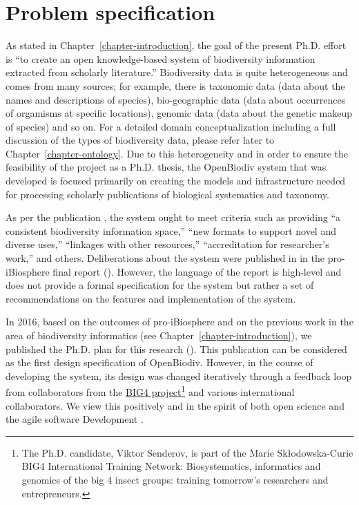 \chapter{Problem specification}
\label{chapter-problem-defintion}

As stated in Chapter~\ref{chapter-introduction}, the goal of the present Ph.D. effort is ``to create an open knowledge-based system of biodiversity information extracted from scholarly literature.'' Biodiversity data is quite heterogeneous and comes from many sources; for example, there is taxonomic data (data about the names and descriptions of species), bio-geographic data (data about occurrences of orgamisms at specific locations), genomic data (data about the genetic makeup of species) and so on. For a detailed domain conceptualization including a full discussion of the types of biodiversity data, please refer later to Chapter~\ref{chapter-ontology}. Due to this heterogeneity and in order to ensure the feasibility of the project as a Ph.D. thesis, the OpenBiodiv system that was developed is focused primarily on creating the models and infrastructure needed for processing scholarly publications of biological systematics and taxonomy. 

As per the publication \cite{noauthor_open_2014}, the system ought to meet criteria such as providing ``a consistent biodiversity information space,'' ``new formats to support novel and diverse uses,'' ``linkages with other resources,'' ``accreditation for researcher's work,'' and others. Deliberations about the system were published in in the pro-iBiosphere final report (\cite{soraya_sierra_coordination_2014}). However, the language of the report is high-level and does not provide a formal specification for the system but rather a set of recommendations on the features and implementation of the system.

In 2016, based on the outcomes of pro-iBiosphere and on the previous work in the area of biodiversity informatics (see Chapter~\ref{chapter-introduction}), we published the Ph.D. plan for this research (\cite{senderov_open_2016}). This publication can be considered as the first design specification of OpenBiodiv. However, in the course of developing the system, its design was changed iteratively through a feedback loop from collaborators from the \href{http://big4-project.eu}{BIG4 project}\footnote{The Ph.D. candidate, Viktor Senderov, is part of the Marie Skłodowska-Curie BIG4 International Training Network: Biosystematics, informatics and genomics of the big 4 insect groups: training tomorrow's researchers and entrepreneurs.} and various international collaborators. We view this positively and in the spirit of both open science and the agile software Development \cite{beck_manifesto_2001}.

